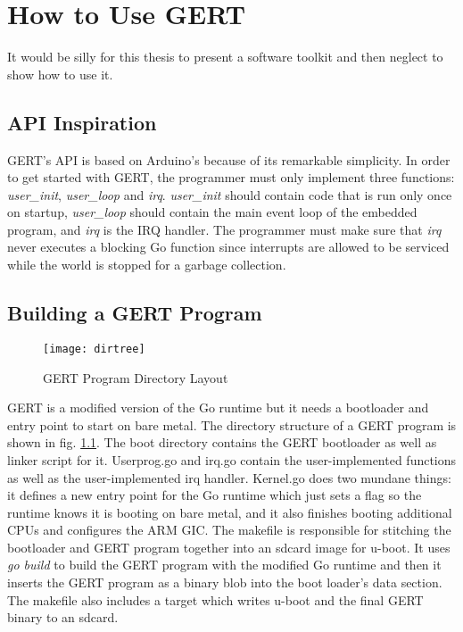 \chapter{How to Use GERT}

It would be silly for this thesis to present a software toolkit and then
neglect to show how to use it.

\section{API Inspiration}
GERT's API is based on Arduino's because of its remarkable simplicity. In order to
get started with GERT, the programmer must only implement three functions: \textit{user\_init},
\textit{user\_loop} and \textit{irq}. \textit{user\_init} should contain code that is run only once
on startup, \textit{user\_loop} should contain the main event loop of the embedded program, and
\textit{irq} is the IRQ handler. The programmer must make sure that \textit{irq} never executes
a blocking Go function since interrupts are allowed to be serviced while the world is stopped for
a garbage collection.

\section{Building a GERT Program}

\begin{figure}[h]
\begin{center}
  \texttt{[image: dirtree]}
\end{center}
  \caption{GERT Program Directory Layout} \label{fig:dtree}
\end{figure}

GERT is a modified version of the Go runtime but it needs a bootloader
and entry point to start on bare metal. The directory structure of a GERT
program is shown in fig. \ref{fig:dtree}. The boot directory contains the GERT
bootloader as well as linker script for it. Userprog.go and irq.go contain
the user-implemented functions as well as the user-implemented irq handler.
Kernel.go does two mundane things: it defines a new entry point for the Go runtime
which just sets a flag so the runtime knows it is booting on bare metal, and
it also finishes booting additional CPUs and configures the ARM GIC. The makefile
is responsible for stitching the bootloader and GERT program together into an
sdcard image for u-boot. It uses \textit{go build} to build the GERT program
with the modified Go runtime and then it inserts the GERT program as a binary blob
into the boot loader's data section. The makefile also includes a target which writes
u-boot and the final GERT binary to an sdcard.

